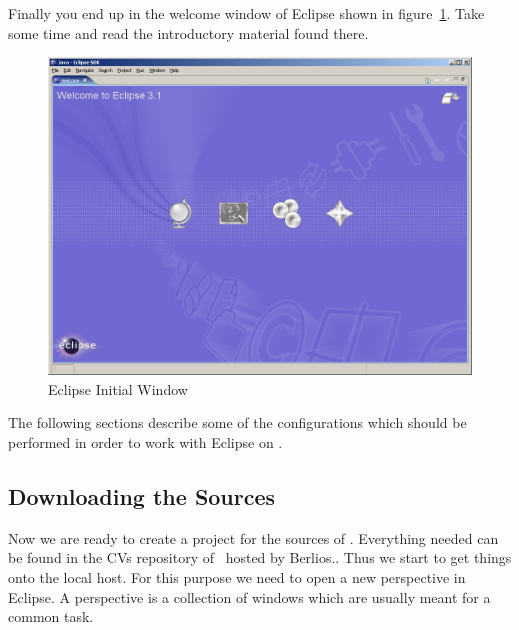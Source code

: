 \documentclass{extex-doc}
\begin{document}
Finally you end up in the welcome window of Eclipse shown in
figure~\ref{fig:eclipse-welcome}. Take some time and read the
introductory material found there.
\begin{figure}[h]
  \centering  \includegraphics[scale=.25]{image/eclipse-welcome}
  \caption{Eclipse Initial Window}\label{fig:eclipse-welcome}
\end{figure}

The following sections describe some of the configurations which
should be performed in order to work with Eclipse on \ExTeX.


\subsection{Downloading the Sources}

Now we are ready to create a project for the sources of \ExTeX.
Everything needed can be found in the CVs repository of \ExTeX\ hosted
by Berlios.. Thus we start to get things onto the local host. For this
purpose we need to open a new perspective in Eclipse. A perspective is
a collection of windows which are usually meant for a common task.
\end{document}
